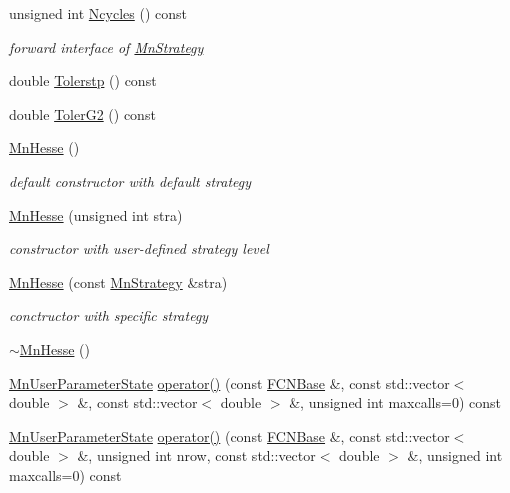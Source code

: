 \begin{DoxyCompactItemize}
\item 
unsigned int \mbox{\hyperlink{classROOT_1_1Minuit2_1_1MnHesse_a5a84b9459469f2edf55f28d8d579a00d}{Ncycles}} () const
\begin{DoxyCompactList}\small\item\em forward interface of \mbox{\hyperlink{classROOT_1_1Minuit2_1_1MnStrategy}{Mn\+Strategy}} \end{DoxyCompactList}\item 
double \mbox{\hyperlink{classROOT_1_1Minuit2_1_1MnHesse_a4b36474a0d157ecb634bbf5d120db669}{Tolerstp}} () const
\item 
double \mbox{\hyperlink{classROOT_1_1Minuit2_1_1MnHesse_ae625b94360c1c974854b63aedbcc6a1a}{Toler\+G2}} () const
\item 
\mbox{\hyperlink{classROOT_1_1Minuit2_1_1MnHesse_a3be9ef44f3e8808dbd225df9a22aeab8}{Mn\+Hesse}} ()
\begin{DoxyCompactList}\small\item\em default constructor with default strategy \end{DoxyCompactList}\item 
\mbox{\hyperlink{classROOT_1_1Minuit2_1_1MnHesse_ad68578086b8b53c029be88acdfe5ec62}{Mn\+Hesse}} (unsigned int stra)
\begin{DoxyCompactList}\small\item\em constructor with user-\/defined strategy level \end{DoxyCompactList}\item 
\mbox{\hyperlink{classROOT_1_1Minuit2_1_1MnHesse_a06f4f5211bf9c85c8a94fe3be518cdeb}{Mn\+Hesse}} (const \mbox{\hyperlink{classROOT_1_1Minuit2_1_1MnStrategy}{Mn\+Strategy}} \&stra)
\begin{DoxyCompactList}\small\item\em conctructor with specific strategy \end{DoxyCompactList}\item 
\mbox{\hyperlink{classROOT_1_1Minuit2_1_1MnHesse_a7e8672c0a87502a0c75c6c0f9923f7b8}{$\sim$\+Mn\+Hesse}} ()
\item 
\mbox{\hyperlink{classROOT_1_1Minuit2_1_1MnUserParameterState}{Mn\+User\+Parameter\+State}} \mbox{\hyperlink{classROOT_1_1Minuit2_1_1MnHesse_aa0af93c1c82038bab7ffe84c198fa176}{operator()}} (const \mbox{\hyperlink{classROOT_1_1Minuit2_1_1FCNBase}{F\+C\+N\+Base}} \&, const std\+::vector$<$ double $>$ \&, const std\+::vector$<$ double $>$ \&, unsigned int maxcalls=0) const
\item 
\mbox{\hyperlink{classROOT_1_1Minuit2_1_1MnUserParameterState}{Mn\+User\+Parameter\+State}} \mbox{\hyperlink{classROOT_1_1Minuit2_1_1MnHesse_aa02f8d7bd10ea245658c9c1b3e296a45}{operator()}} (const \mbox{\hyperlink{classROOT_1_1Minuit2_1_1FCNBase}{F\+C\+N\+Base}} \&, const std\+::vector$<$ double $>$ \&, unsigned int nrow, const std\+::vector$<$ double $>$ \&, unsigned int maxcalls=0) const

\end{DoxyCompactItemize}
